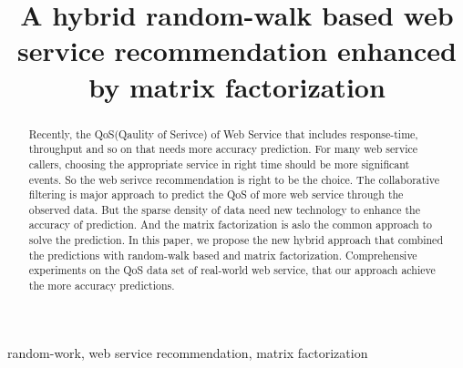\documentclass[conference]{IEEEtran}
\begin{document}
\title{A hybrid random-walk based web service recommendation enhanced by matrix factorization}

\author{
  \and
}

\maketitle

\begin{abstract}
Recently, the QoS(Qaulity of Serivce) of Web Service that includes response-time, throughput and so on that needs more accuracy prediction. For many web service  callers, choosing the appropriate service in right time should be more significant events. So the web serivce recommendation is right to be the choice. The collaborative filtering is major approach to predict the QoS of more web service through the observed data. But the sparse density of data need new technology to enhance the accuracy of prediction. And the matrix factorization is aslo the common approach to solve the prediction. In this paper, we propose the new hybrid approach that combined the predictions with random-walk based and matrix factorization. Comprehensive experiments on the QoS data set of real-world web service, that our approach achieve the more accuracy predictions.
\end{abstract}

\begin{IEEEkeywords}
  random-work, web service recommendation, matrix factorization
\end{IEEEkeywords}

\IEEEpeerreviewmaketitle

\end{document}
